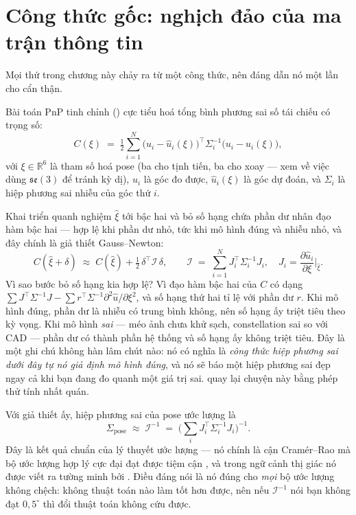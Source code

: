 \documentclass[../../marker.tex]{subfiles}
\begin{document}
\section{Công thức gốc: nghịch đảo của ma trận thông tin}

Mọi thứ trong chương này chảy ra từ một công thức, nên đáng dẫn nó một lần cho cẩn thận.

Bài toán PnP tinh chỉnh () cực tiểu hoá tổng bình phương sai số tái chiếu có trọng số:
\[
C(\xi) \;=\; \tfrac{1}{2}\sum_{i=1}^{N} \big(u_i - \hat{u}_i(\xi)\big)^{\top}\Sigma_i^{-1}\big(u_i - \hat{u}_i(\xi)\big),
\]
với \(\xi \in \mathbb{R}^6\) là tham số hoá pose (ba cho tịnh tiến, ba cho xoay --- xem  về việc dùng \(\mathfrak{se}(3)\) để tránh kỳ dị), \(u_i\) là góc đo được, \(\hat{u}_i(\xi)\) là góc dự đoán, và \(\Sigma_i\) là hiệp phương sai nhiễu của góc thứ \(i\).

Khai triển quanh nghiệm \(\hat{\xi}\) tới bậc hai và bỏ số hạng chứa phần dư nhân đạo hàm bậc hai --- hợp lệ khi phần dư nhỏ, tức khi mô hình đúng và nhiễu nhỏ, và đây chính là giả thiết Gauss--Newton:
\[
C(\hat{\xi}+\delta) \;\approx\; C(\hat{\xi}) + \tfrac{1}{2}\,\delta^{\top}\mathcal{I}\,\delta,
\qquad
\mathcal{I} \;=\; \sum_{i=1}^{N} J_i^{\top}\Sigma_i^{-1}J_i, \quad J_i = \frac{\partial \hat{u}_i}{\partial \xi}\bigg|_{\hat{\xi}} .
\]
Vì sao bước bỏ số hạng kia hợp lệ? Vì đạo hàm bậc hai của \(C\) có dạng \(\sum J^{\top}\Sigma^{-1}J - \sum r^{\top}\Sigma^{-1}\partial^2\hat{u}/\partial\xi^2\), và số hạng thứ hai tỉ lệ với phần dư \(r\). Khi mô hình đúng, phần dư là nhiễu có trung bình không, nên số hạng ấy triệt tiêu theo kỳ vọng. Khi mô hình \emph{sai} --- méo ảnh chưa khử sạch, constellation sai so với CAD --- phần dư có thành phần hệ thống và số hạng ấy không triệt tiêu. Đây là một ghi chú không hàn lâm chút nào: nó có nghĩa là \emph{công thức hiệp phương sai dưới đây tự nó giả định mô hình đúng}, và nó sẽ báo một hiệp phương sai đẹp ngay cả khi bạn đang đo quanh một giá trị sai.  quay lại chuyện này bằng phép thử tính nhất quán.

Với giả thiết ấy, hiệp phương sai của pose ước lượng là
\begin{equation}
\Sigma_{\text{pose}} \;\approx\; \mathcal{I}^{-1} \;=\; \Big(\sum_{i} J_i^{\top}\Sigma_i^{-1}J_i\Big)^{-1}.
\label{eq:a05-cov}
\end{equation}
Đây là kết quả chuẩn của lý thuyết ước lượng --- nó chính là cận Cramér--Rao mà bộ ước lượng hợp lý cực đại đạt được tiệm cận \cite[chương 3]{kay1993}, và trong ngữ cảnh thị giác nó được viết ra tường minh bởi \cite{haralick1998propagating}. Điều đáng nói là nó đúng cho \emph{mọi} bộ ước lượng không chệch: không thuật toán nào làm tốt hơn được, nên nếu \(\mathcal{I}^{-1}\) nói bạn không đạt \(0{,}5^\circ\) thì đổi thuật toán không cứu được.
\end{document}
